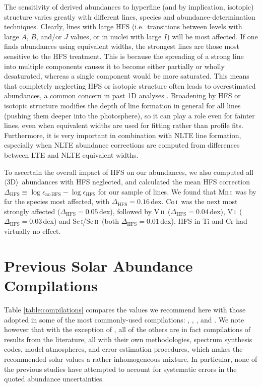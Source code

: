 \documentclass[traditabstract]{aa}
\newcommand{\oneDAV}{$\langle\mathrm{3D}\rangle$}
\newcommand{\altsci}{Sc\,\textsc{i}}
\newcommand{\altscii}{Sc\,\textsc{ii}}
\newcommand{\altvi}{V\,\textsc{i}}
\newcommand{\altvii}{V\,\textsc{ii}}
\newcommand{\altmni}{Mn\,\textsc{i}}
\newcommand{\altcoi}{Co\,\textsc{i}}
\newcommand{\scanii}{\altscii\ }
\newcommand{\vi}{\altvi\ }
\newcommand{\vii}{\altvii\ }
\newcommand{\mni}{\altmni\ }
\newcommand{\coi}{\altcoi\ }
\begin{document}
The sensitivity of derived abundances to hyperfine (and by
implication, isotopic) structure varies greatly with different
lines, species and abundance-determination techniques.  Clearly,
lines with large HFS (i.e.~transitions between
levels with large $A$, $B$, and/or $J$ values, or in nuclei with
large $I$) will be most affected.  If one finds abundances using
equivalent widths, the strongest lines are those most sensitive to
the HFS treatment.  This is because the spreading of a strong line
into multiple components causes it to become either partially or
wholly desaturated, whereas a single component would be more
saturated.  This means that completely neglecting HFS or isotopic
structure often leads to overestimated abundances, a common concern
in past 1D analyses \citep[e.g.~][]{vonderHeide68, Holweger71,
Kurucz93, Prochaska00}.  Broadening by HFS or isotopic structure 
modifies the depth of line formation in general for all lines 
(pushing them deeper into the photosphere), so it can play a 
role even for fainter lines, even when equivalent widths are used for fitting
rather than profile fits. Furthermore, it is very important 
in combination with NLTE line formation, especially when NLTE 
abundance corrections are computed from differences between 
LTE and NLTE equivalent widths.

To ascertain the overall impact of HFS on our abundances, we also computed all \oneDAV\ abundances with HFS neglected, and calculated the mean HFS correction $\Delta_\mathrm{HFS}\equiv\log\epsilon_\mathrm{no\,HFS}-\log\epsilon_\mathrm{HFS}$ for our sample of lines. We found that \mni was by far the species most affected, with $\Delta_\mathrm{HFS}=0.16$\,dex.  \coi was the next most strongly affected ($\Delta_\mathrm{HFS}=0.05$\,dex), followed by \vii ($\Delta_\mathrm{HFS}=0.04$\,dex), \vi ($\Delta_\mathrm{HFS}=0.03$\,dex) and \altsci/\scanii (both $\Delta_\mathrm{HFS}=0.01$\,dex).  HFS in Ti and Cr had virtually no effect.


\section{Previous Solar Abundance Compilations}
\label{compilations}

Table \ref{table:compilations} compares the values we recommend here with those adopted in some of the most commonly-used compilations:
, , ,  and \citet{Lodders09}. 
We note however that with the exception of , all of the others are in fact compilations
of results from the literature, all with their own methodologies, spectrum synthesis codes, model atmospheres,
and error estimation procedures, which makes the recommended solar values a rather inhomogeneous mixture. 
In particular, none of the previous studies have attempted to account for systematic errors in 
the quoted abundance uncertainties.
\end{document}
